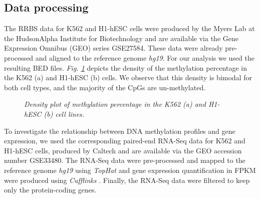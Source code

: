 \subsection{Data processing} \label{meth-encode-data-subsect}
The RRBS data for K562 and H1-hESC cells were produced by the Myers Lab at the HudsonAlpha Institute for Biotechnology and are available via the Gene Expression Omnibus (GEO) series GSE27584. These data were already pre-processed and aligned to the reference genome \emph{hg19}. For our analysis we used the resulting BED files. \emph{Fig. \ref{meth-dens-pic}} depicts the density of the methylation percentage in the K562 (a) and H1-hESC (b) cells. We observe that this density is bimodal for both cell types, and the majority of the CpGs are un-methylated. 

\begin{figure}[ht!]
     \begin{center}
    \end{center}
    \caption{\emph{Density plot of methylation percentage in the K562 (a) and H1-hESC (b) cell lines.}}
   \label{meth-dens-pic}
\end{figure}

To investigate the relationship between DNA methylation profiles and gene expression, we used the corresponding paired-end RNA-Seq data for K562 and H1-hESC cells, produced by Caltech and are available via the GEO accession number GSE33480. The RNA-Seq data were pre-processed and mapped to the reference genome \emph{hg19} using \emph{TopHat} \citep{Trapnell2009} and gene expression quantification in FPKM were produced using \emph{Cufflinks} \citep{Trapnell2010}. Finally, the RNA-Seq data were filtered to keep only the protein-coding genes. 


